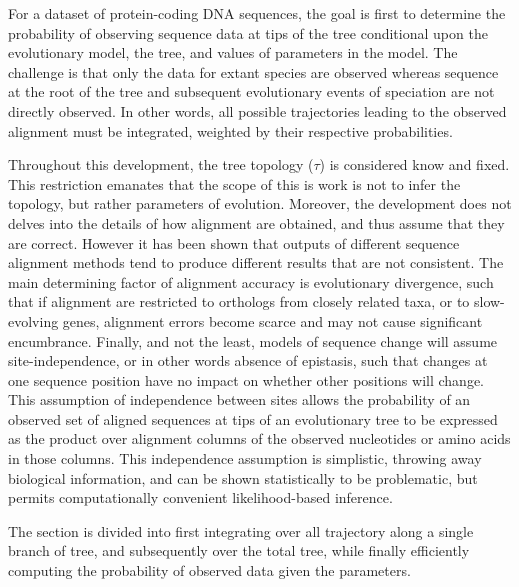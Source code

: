 For a dataset of protein-coding \acrshort{DNA} sequences, the goal is first to determine the probability of observing sequence data at tips of the tree conditional upon the evolutionary model, the tree, and values of parameters in the model.
The challenge is that only the data for extant species are observed whereas sequence at the root of the tree and subsequent evolutionary events of speciation are not directly observed.
In other words, all possible trajectories leading to the observed alignment must be integrated, weighted by their respective probabilities.

Throughout this development, the tree topology ($\tau$) is considered know and fixed.
This restriction emanates that the scope of this is work is not to infer the topology, but rather parameters of evolution.
Moreover, the development does not delves into the details of how alignment are obtained, and thus assume that they are correct.
However it has been shown that outputs of different sequence alignment methods tend to produce different results that are not consistent.
The main determining factor of alignment accuracy is evolutionary divergence, such that if alignment are restricted to orthologs from closely related taxa, or to slow-evolving genes, alignment errors become scarce and may not cause significant encumbrance.
Finally, and not the least, models of sequence change will assume site-independence, or in other words absence of epistasis, such that changes at one sequence position have no impact on whether other positions will change.
This assumption of independence between sites allows the probability of an observed set of aligned sequences at tips of an evolutionary tree to be expressed as the product over alignment columns of the observed nucleotides or amino acids in those columns. 
This independence assumption is simplistic, throwing away biological information, and can be shown statistically to be problematic, but permits computationally convenient likelihood-based inference.

The section is divided into first integrating over all trajectory along a single branch of tree, and subsequently over the total tree, while finally efficiently computing the probability of observed data given the parameters.

